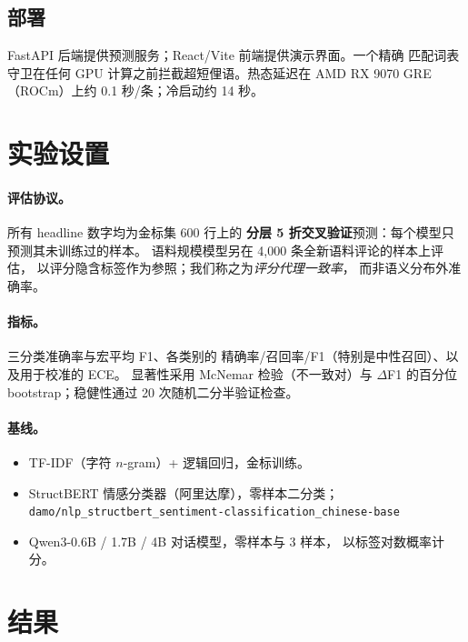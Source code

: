 \documentclass[11pt,a4paper]{article}
\newcommand{\code}[1]{\texttt{#1}}
\begin{document}
\subsection{部署}
\label{sec:deploy}

FastAPI 后端提供预测服务；React/Vite 前端提供演示界面。一个精确
匹配词表守卫在任何 GPU 计算之前拦截超短俚语。热态延迟在 AMD
RX 9070 GRE（ROCm）上约 0.1 秒/条；冷启动约 14 秒。

\section{实验设置}
\label{sec:setup}

\paragraph{评估协议。} 所有 headline 数字均为金标集 600 行上的
\textbf{分层 5 折交叉验证}预测：每个模型只预测其未训练过的样本。
语料规模模型另在 4{,}000 条全新语料评论的样本上评估，
以评分隐含标签作为参照；我们称之为\emph{评分代理一致率}，
而非语义分布外准确率。

\paragraph{指标。} 三分类准确率与宏平均 F1、各类别的
精确率/召回率/F1（特别是中性召回）、以及用于校准的 ECE。
显著性采用 McNemar 检验（不一致对）与 $\Delta$F1 的百分位
bootstrap；稳健性通过 20 次随机二分半验证检查。

\paragraph{基线。}
\begin{itemize}
  \item TF-IDF（字符 $n$-gram）+ 逻辑回归，金标训练。
  \item StructBERT 情感分类器（阿里达摩），零样本二分类；\\
        \footnotesize\code{damo/nlp\_structbert\_sentiment-classification\_chinese-base}
  \item Qwen3-0.6B / 1.7B / 4B 对话模型，零样本与 3 样本，
        以标签对数概率计分。
\end{itemize}

\section{结果}
\label{sec:results}
\end{document}
